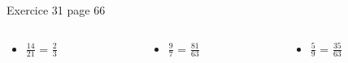 \documentclass[xcolor={dvipsnames}]{beamer}
\begin{document}
\begin{frame}
	
	\begin{block}{Exercice 31 page 66}
		
	\begin{columns}
		\begin{column}{0.25\textwidth}
			\begin{huge}
				\begin{itemize}
					\item $\frac{14}{21}$ = \pause $\frac{2}{3}$ \pause
					
					
					
					
				\end{itemize}	
			\end{huge}
			
		\end{column}
		
		\begin{column}{0.25\textwidth}
			\begin{huge}
				\begin{itemize}
					
					
					\item $\frac{9}{7}$ = \pause $\frac{81}{63}$\pause
					
					
					
				\end{itemize}	
			\end{huge}
			
		\end{column}
	
		\begin{column}{0.25\textwidth}
			\begin{huge}
				\begin{itemize}
					\item $\frac{5}{9}$ = \pause $\frac{35}{63}$\pause
					
				\end{itemize}	
			\end{huge}
			
		\end{column}
	

\end{columns}
\end{block}
\end{frame}
\end{document}
